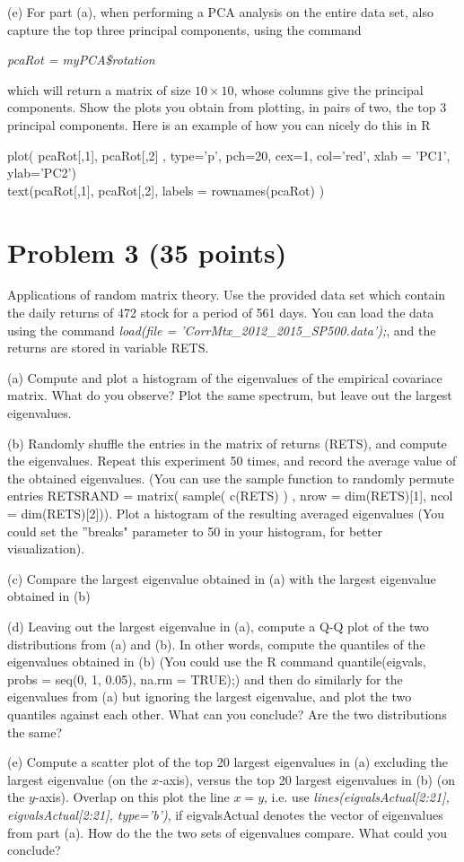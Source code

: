 \documentclass[12pt]{article}
\begin{document}
(e) For part (a), when performing a PCA analysis on the entire data set, also  capture the top three principal components, using the command 
\begin{center}
\textit{pcaRot = myPCA\$rotation}
\end{center}
which will return a matrix of size $10 \times 10$, whose columns give the principal components. Show the plots you obtain from plotting, in pairs of two, the top 3 principal components. Here is an example of how you can nicely do this in R
\begin{center}
plot( pcaRot[,1], pcaRot[,2] , type='p', pch=20, cex=1, col='red', xlab = 'PC1', ylab='PC2') \\
text(pcaRot[,1], pcaRot[,2], labels = rownames(pcaRot) )
\end{center}




\section{Problem 3 (35 points)}
Applications of random matrix theory. Use the provided  data set which contain  the daily returns of 472 stock for a period of 561 days. You can load the data using the command \textit{load(file = 'CorrMtx\_2012\_2015\_SP500.data');}, and the returns are stored in variable RETS.

(a) Compute and plot a histogram of the eigenvalues of the empirical covariace matrix. What do you observe? Plot the same spectrum, but leave out the largest eigenvalues.

(b) Randomly shuffle the entries in the matrix of returns (RETS), and compute the eigenvalues. Repeat this experiment 50 times, and record the average value of the obtained eigenvalues.  (You can use the sample function to randomly permute entries RETSRAND = matrix( sample( c(RETS) ) , nrow = dim(RETS)[1], ncol = dim(RETS)[2])). 
Plot a histogram of the resulting averaged eigenvalues  (You could set the ''breaks" parameter to 50 in your histogram, for better visualization).

(c) Compare the largest eigenvalue obtained in (a) with the largest eigenvalue obtained in (b)

(d) Leaving out the largest eigenvalue in (a), compute a Q-Q plot of the two distributions from (a) and (b). In other words, compute the quantiles of the eigenvalues obtained in (b) (You could use the R command quantile(eigvals, probs = seq(0, 1, 0.05), na.rm = TRUE);) and then do similarly for the eigenvalues from (a) but ignoring the largest eigenvalue, and plot the two quantiles against each other. What can you conclude? Are the two distributions the same?

(e) Compute a scatter plot of the top 20 largest eigenvalues in (a) excluding the largest eigenvalue (on the $x$-axis), versus the top 20 largest eigenvalues in (b) (on the $y$-axis). Overlap on this plot the line $x=y$, i.e. use  \textit{lines(eigvalsActual[2:21], eigvalsActual[2:21], type='b')},
if eigvalsActual denotes the vector of eigenvalues from part (a). How do the the two sets of eigenvalues compare. What could you conclude?


\vspace{6mm}
\end{document}
